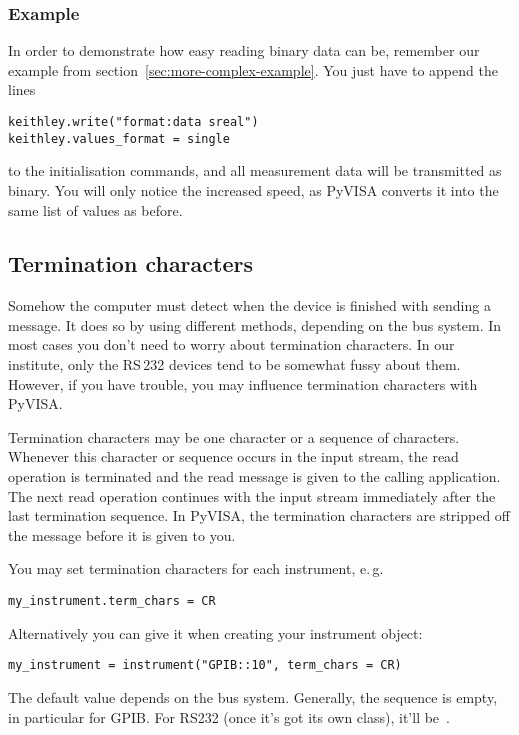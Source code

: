 \documentclass{howto}
\begin{document}
\subsubsection{Example}
\label{sec:binary-example}

In order to demonstrate how easy reading binary data can be, remember our
example from section~\ref{sec:more-complex-example}.  You just have to append
the lines
\begin{verbatim}
keithley.write("format:data sreal")
keithley.values_format = single
\end{verbatim}
to the initialisation commands, and all measurement data will be transmitted as
binary.  You will only notice the increased speed, as PyVISA converts it into
the same list of values as before.


\subsection{Termination characters}
\label{sec:termchars}

Somehow the computer must detect when the device is finished with sending a
message.  It does so by using different methods, depending on the bus system.
In most cases you don't need to worry about termination characters.  In our
institute, only the RS\,232 devices tend to be somewhat fussy about them.
However, if you have trouble, you may influence termination characters with
PyVISA\@.

Termination characters may be one character or a sequence of characters.
Whenever this character or sequence occurs in the input stream, the read
operation is terminated and the read message is given to the calling
application.  The next read operation continues with the input stream
immediately after the last termination sequence.  In PyVISA, the termination
characters are stripped off the message before it is given to you.

You may set termination characters for each instrument, e.\,g.
\begin{verbatim}
my_instrument.term_chars = CR
\end{verbatim}
Alternatively you can give it when creating your instrument object:
\begin{verbatim}
my_instrument = instrument("GPIB::10", term_chars = CR)
\end{verbatim}
The default value depends on the bus system.  Generally, the sequence is empty,
in particular for GPIB\@.  For RS232 (once it's got its own class), it'll
be~\@.
\end{document}
